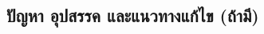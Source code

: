 \documentclass[11pt,a4paper]{article}
\begin{document}
\subsection{ปัญหา อุปสรรค และแนวทางแก้ไข (ถ้ามี)}


\end{document}
